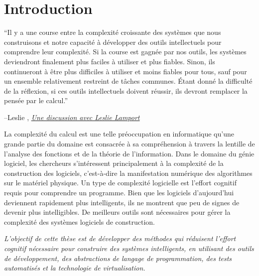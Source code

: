 \chapter{Introduction}\label{ch:introduction}

\setlength{\epigraphwidth}{0.85\textwidth}
\epigraph{``Il y a une course entre la complexité croissante des systèmes que nous construisons et notre capacité à développer des outils intellectuels pour comprendre leur complexité. Si la course est gagnée par nos outils, les systèmes deviendront finalement plus faciles à utiliser et plus fiables. Sinon, ils continueront à être plus difficiles à utiliser et moins fiables pour tous, sauf pour un ensemble relativement restreint de tâches communes. Étant donné la difficulté de la réflexion, si ces outils intellectuels doivent réussir, ils devront remplacer la pensée par le calcul.''}{\begin{flushright}--Leslie \citet{lamport2002discussion}, \href{https://www.microsoft.com/en-us/research/uploads/prod/2016/12/A-Discussion-With-Leslie-Lamport.pdf}{\textit{Une discussion avec Leslie Lamport}}\end{flushright}}

La complexité du calcul est une telle préoccupation en informatique qu'une grande partie du domaine est consacrée à sa compréhension à travers la lentille de l'analyse des fonctions et de la théorie de l'information. Dans le domaine du génie logiciel, les chercheurs s'intéressent principalement à la complexité de la construction des logiciels, c'est-à-dire la manifestation numérique des algorithmes sur le matériel physique. Un type de complexité logicielle est l'effort cognitif requis pour comprendre un programme. Bien que les logiciels d'aujourd'hui deviennent rapidement plus intelligents, ils ne montrent que peu de signes de devenir plus intelligibles. De meilleurs outils sont nécessaires pour gérer la complexité des systèmes logiciels de construction.

\textit{L'objectif de cette thèse est de développer des méthodes qui réduisent l'effort cognitif nécessaire pour construire des systèmes intelligents, en utilisant des outils de développement, des abstractions de langage de programmation, des tests automatisés et la technologie de virtualisation.}

